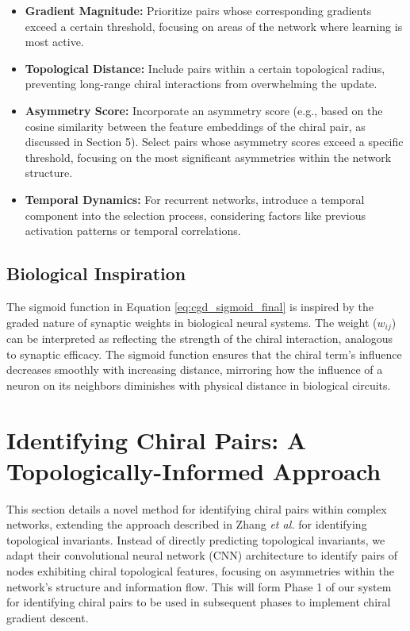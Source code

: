 \documentclass[12pt, a4paper]{article}
\begin{document}
\begin{itemize}
\item \textbf{Gradient Magnitude:} Prioritize pairs whose corresponding gradients exceed a certain threshold, focusing on areas of the network where learning is most active.
\item \textbf{Topological Distance:} Include pairs within a certain topological radius, preventing long-range chiral interactions from overwhelming the update.
\item \textbf{Asymmetry Score:} Incorporate an asymmetry score (e.g., based on the cosine similarity between the feature embeddings of the chiral pair, as discussed in Section 5). Select pairs whose asymmetry scores exceed a specific threshold, focusing on the most significant asymmetries within the network structure.
\item \textbf{Temporal Dynamics:} For recurrent networks, introduce a temporal component into the selection process, considering factors like previous activation patterns or temporal correlations.
\end{itemize}

\subsection{Biological Inspiration}

The sigmoid function in Equation \ref{eq:cgd_sigmoid_final} is inspired by the graded nature of synaptic weights in biological neural systems. The weight ($w_{ij}$) can be interpreted as reflecting the strength of the chiral interaction, analogous to synaptic efficacy. The sigmoid function ensures that the chiral term's influence decreases smoothly with increasing distance, mirroring how the influence of a neuron on its neighbors diminishes with physical distance in biological circuits.
 
\section{Identifying Chiral Pairs: A Topologically-Informed Approach}

This section details a novel method for identifying chiral pairs within complex networks, extending the approach described in Zhang \textit{et al.} \cite{zhang2018machine} for identifying topological invariants.  Instead of directly predicting topological invariants, we adapt their convolutional neural network (CNN) architecture to identify pairs of nodes exhibiting chiral topological features, focusing on asymmetries within the network's structure and information flow.  This will form Phase 1 of our system for identifying chiral pairs to be used in subsequent phases to implement chiral gradient descent.
\end{document}
